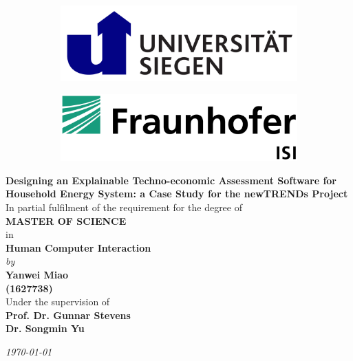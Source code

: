 \begin{titlepage}

\begin{center}

\vspace*{-1cm}

\begin{figure}[h]
  \begin{subfigure}{0.50\textwidth}
    \includegraphics[width=0.8\linewidth, left]{Images/siegen.png}
  \end{subfigure}
  \begin{subfigure}{0.49\textwidth}
    \includegraphics[width=0.8\linewidth, right]{Images/isi.jpeg}
  \end{subfigure}
\end{figure}

\vfill

{\Large \bf Designing an Explainable Techno-economic Assessment Software for Household Energy System: a Case Study for the newTRENDs Project} \\

\vfill
In partial fulfilment of the requirement for the degree of\\
{\large \bf MASTER OF SCIENCE}\\
in\\ 
{\large \bf Human Computer Interaction } \\
{\em  by} \\
{\large \bf Yanwei Miao} \\
{\large \bf (1627738)}\\

Under the supervision of \\
{\bf\large Prof. Dr. Gunnar Stevens} \\
{\bf\large Dr. Songmin Yu} \\

\vfill

{\it\large \today}

\end{center}

\end{titlepage}

\clearpage